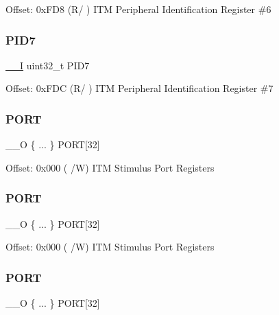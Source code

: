 Offset\+: 0x\+F\+D8 (R/ ) I\+TM Peripheral Identification Register \#6 \mbox{\label{struct_i_t_m___type_a247fae2f4a140d4da5e8a044370dedec}} 
\subsubsection{\texorpdfstring{PID7}{PID7}}
{\footnotesize\ttfamily \mbox{\hyperlink{core__sc300_8h_af63697ed9952cc71e1225efe205f6cd3}{\+\_\+\+\_\+I}} uint32\+\_\+t P\+I\+D7}

Offset\+: 0x\+F\+DC (R/ ) I\+TM Peripheral Identification Register \#7 \mbox{\label{struct_i_t_m___type_aa6d310cc8eabd3413456ed2c6d28435e}} 
\subsubsection{\texorpdfstring{PORT}{PORT}\hspace{0.1cm}{\footnotesize\ttfamily [1/3]}}
{\footnotesize\ttfamily \+\_\+\+\_\+O \{ ... \}    P\+O\+RT\mbox{[}32\mbox{]}}

Offset\+: 0x000 ( /W) I\+TM Stimulus Port Registers \mbox{\label{struct_i_t_m___type_a85a40c43c0c3a77535a31a0aefc0fe76}} 
\subsubsection{\texorpdfstring{PORT}{PORT}\hspace{0.1cm}{\footnotesize\ttfamily [2/3]}}
{\footnotesize\ttfamily \+\_\+\+\_\+O \{ ... \}    P\+O\+RT\mbox{[}32\mbox{]}}

Offset\+: 0x000 ( /W) I\+TM Stimulus Port Registers \mbox{\label{struct_i_t_m___type_a4fb8d5beccf8bf958357bf9d59856f05}} 
\subsubsection{\texorpdfstring{PORT}{PORT}\hspace{0.1cm}{\footnotesize\ttfamily [3/3]}}
{\footnotesize\ttfamily \+\_\+\+\_\+O \{ ... \}    P\+O\+RT\mbox{[}32\mbox{]}}

